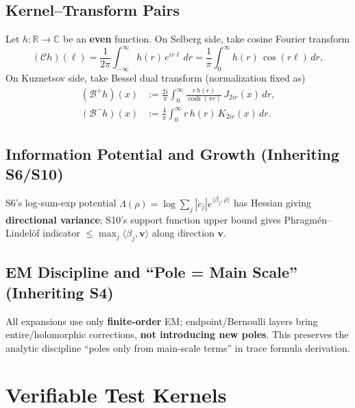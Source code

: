 \documentclass[11pt,a4paper]{article}
\theoremstyle{remark}
\begin{document}
\subsection{Kernel--Transform Pairs}

Let $h:\mathbb{R}\to\mathbb{C}$ be an \textbf{even} function. On Selberg side, take cosine Fourier transform
\begin{equation}
(\mathcal{C} h)(\ell)=\frac{1}{2\pi}\int_{-\infty}^{\infty} h(r)\,e^{i r\ell}\,dr
=\frac{1}{\pi}\int_0^\infty h(r)\,\cos(r\ell)\,dr,
\end{equation}
On Kuznetsov side, take Bessel dual transform (normalization fixed as)
\begin{equation}
\begin{aligned}
(\mathcal{B}^{+}h)(x)&:=\frac{2i}{\pi}\int_0^\infty \frac{r\, h(r)}{\cosh(\pi r)}\,J_{2ir}(x)\,dr,\\[2pt]
(\mathcal{B}^{-}h)(x)&:=\frac{4}{\pi}\int_0^\infty r\, h(r)\,K_{2ir}(x)\,dr.
\end{aligned}
\end{equation}

\subsection{Information Potential and Growth (Inheriting S6/S10)}

S6's log-sum-exp potential $\Lambda(\rho)=\log\sum_j |c_j| e^{\langle\beta_j,\rho\rangle}$ has Hessian giving \textbf{directional variance}; S10's support function upper bound gives Phragmén--Lindelöf indicator $\le \max_j\langle\beta_j,\mathbf{v}\rangle$ along direction $\mathbf{v}$.

\subsection{EM Discipline and ``Pole = Main Scale'' (Inheriting S4)}

All expansions use only \textbf{finite-order} EM; endpoint/Bernoulli layers bring entire/holomorphic corrections, \textbf{not introducing new poles}. This preserves the analytic discipline ``poles only from main-scale terms'' in trace formula derivation.

\section{Verifiable Test Kernels}
\end{document}
